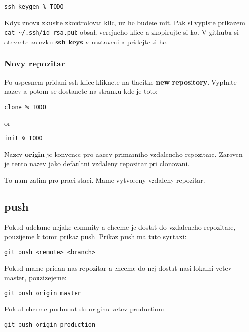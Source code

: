 \documentclass[12pt,a5paper]{article}
\begin{document}
\begin{lstlisting}
ssh-keygen % TODO
\end{lstlisting}

Kdyz znovu zkusite zkontrolovat klic, uz ho budete mit. Pak si vypiste prikazem \lstinline|cat ~/.ssh/id_rsa.pub| obsah verejneho klice a zkopirujte si ho. V githubu si otevrete zalozku {\bf ssh keys} v nastaveni a pridejte si ho.

\subsubsection{Novy repozitar}

Po uspesnem pridani ssh klice kliknete na tlacitko {\bf new repository}. Vyplnite nazev a potom se dostanete na stranku kde je toto:


\begin{lstlisting}
clone % TODO
\end{lstlisting}

or

\begin{lstlisting}
init % TODO
\end{lstlisting}

Nazev {\bf origin} je konvence pro nazev primarniho vzdaleneho repozitare. Zaroven je tento nazev jako defaultni vzdaleny repozitar pri clonovani.

To nam zatim pro praci staci. Mame vytvoreny vzdaleny repozitar.

\subsection{push}

Pokud udelame nejake commity a chceme je dostat do vzdaleneho repozitare, pouzijeme k tomu prikaz push. Prikaz push ma tuto syntaxi:

\begin{lstlisting}
git push <remote> <branch>
\end{lstlisting}

Pokud mame pridan nas repozitar a chceme do nej dostat nasi lokalni vetev master, pouzizejeme:

\begin{lstlisting}
git push origin master
\end{lstlisting}

Pokud chceme pushnout do originu vetev production:

\begin{lstlisting}
git push origin production
\end{lstlisting}
\end{document}
